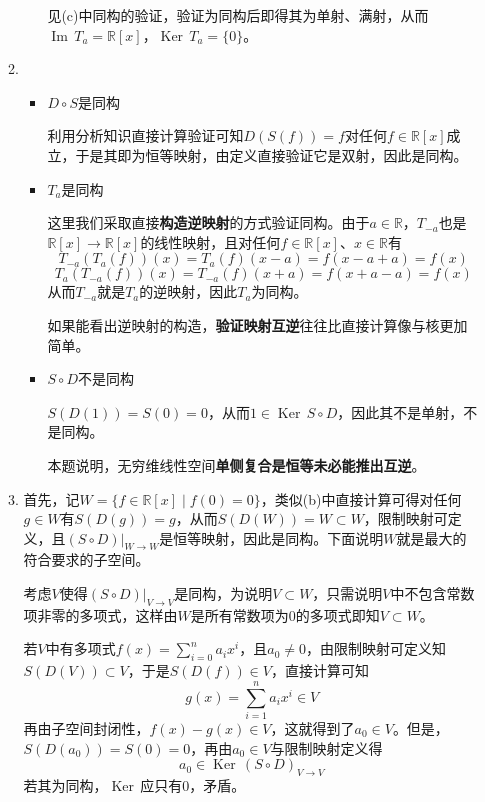 \documentclass[a4paper,UTF8,fontset=windows,AutoFakeBold]{ctexart}
\DeclareMathOperator{\im}{Im\,}
\DeclareMathOperator{\Ker}{Ker\,}
\newcommand*{\note}{\noindent *}
\begin{document}
\begin{enumerate}
\begin{enumerate}
\begin{itemize}
            见(c)中同构的验证，验证为同构后即得其为单射、满射，从而$\im T_a=\mathbb{R}[x]$，$\Ker T_a=\{0\}$。
        \end{itemize}

        \item
        \begin{itemize}
            \item $D\circ S$是同构
            
            利用分析知识直接计算验证可知$D(S(f))=f$对任何$f\in\mathbb{R}[x]$成立，于是其即为恒等映射，由定义直接验证它是双射，因此是同构。

            \item $T_a$是同构
            
            这里我们采取直接\textbf{构造逆映射}的方式验证同构。由于$a\in\mathbb{R}$，$T_{-a}$也是$\mathbb{R}[x]\to\mathbb{R}[x]$的线性映射，且对任何$f\in\mathbb{R}[x]$、$x\in\mathbb{R}$有
            $$T_{-a}(T_a(f))(x)=T_a(f)(x-a)=f(x-a+a)=f(x)$$
            $$T_a(T_{-a}(f))(x)=T_{-a}(f)(x+a)=f(x+a-a)=f(x)$$
            从而$T_{-a}$就是$T_a$的逆映射，因此$T_a$为同构。

            \note 如果能看出逆映射的构造，\textbf{验证映射互逆}往往比直接计算像与核更加简单。

            \item $S\circ D$不是同构
            
            $S(D(1))=S(0)=0$，从而$1\in\Ker S\circ D$，因此其不是单射，不是同构。

            \note 本题说明，无穷维线性空间\textbf{单侧复合是恒等未必能推出互逆}。
        \end{itemize}

        \item
        首先，记$W=\{f\in\mathbb{R}[x]\mid f(0)=0\}$，类似(b)中直接计算可得对任何$g\in W$有$S(D(g))=g$，从而$S(D(W))=W\subset W$，限制映射可定义，且$(S\circ D)|_{W\to W}$是恒等映射，因此是同构。下面说明$W$就是最大的符合要求的子空间。

        考虑$V$使得$(S\circ D)|_{V\to V}$是同构，为说明$V\subset W$，只需说明$V$中不包含常数项非零的多项式，这样由$W$是所有常数项为0的多项式即知$V\subset W$。

        若$V$中有多项式$f(x)=\sum_{i=0}^na_ix^i$，且$a_0\ne 0$，由限制映射可定义知$S(D(V))\subset V$，于是$S(D(f))\in V$，直接计算可知
        $$g(x)=\sum_{i=1}^na_ix^i\in V$$
        再由子空间封闭性，$f(x)-g(x)\in V$，这就得到了$a_0\in V$。但是，$S(D(a_0))=S(0)=0$，再由$a_0\in V$与限制映射定义得
        $$a_0\in\Ker(S\circ D)_{V\to V}$$
        若其为同构，$\Ker$应只有0，矛盾。
    \end{enumerate}


\end{enumerate}
\end{document}
